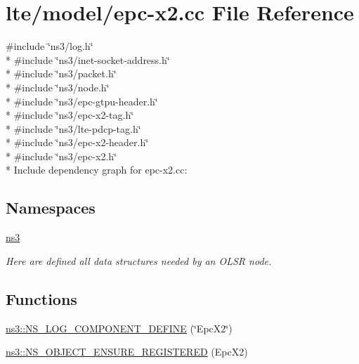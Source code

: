 \hypertarget{epc-x2_8cc}{}\section{lte/model/epc-\/x2.cc File Reference}
\label{epc-x2_8cc}
{\ttfamily \#include \char`\"{}ns3/log.\+h\char`\"{}}\\*
{\ttfamily \#include \char`\"{}ns3/inet-\/socket-\/address.\+h\char`\"{}}\\*
{\ttfamily \#include \char`\"{}ns3/packet.\+h\char`\"{}}\\*
{\ttfamily \#include \char`\"{}ns3/node.\+h\char`\"{}}\\*
{\ttfamily \#include \char`\"{}ns3/epc-\/gtpu-\/header.\+h\char`\"{}}\\*
{\ttfamily \#include \char`\"{}ns3/epc-\/x2-\/tag.\+h\char`\"{}}\\*
{\ttfamily \#include \char`\"{}ns3/lte-\/pdcp-\/tag.\+h\char`\"{}}\\*
{\ttfamily \#include \char`\"{}ns3/epc-\/x2-\/header.\+h\char`\"{}}\\*
{\ttfamily \#include \char`\"{}ns3/epc-\/x2.\+h\char`\"{}}\\*
Include dependency graph for epc-\/x2.cc\+:
\subsection*{Namespaces}
\begin{DoxyCompactItemize}
\item 
 \hyperlink{namespacens3}{ns3}
\begin{DoxyCompactList}\small\item\em Here are defined all data structures needed by an O\+L\+SR node. \end{DoxyCompactList}\end{DoxyCompactItemize}
\subsection*{Functions}
\begin{DoxyCompactItemize}
\item 
\hyperlink{namespacens3_a9fa7ce091684fb02eee25e6c84d2740e}{ns3\+::\+N\+S\+\_\+\+L\+O\+G\+\_\+\+C\+O\+M\+P\+O\+N\+E\+N\+T\+\_\+\+D\+E\+F\+I\+NE} (\char`\"{}Epc\+X2\char`\"{})
\item 
\hyperlink{namespacens3_a661235d2c1fd22cc93c6260b623cac46}{ns3\+::\+N\+S\+\_\+\+O\+B\+J\+E\+C\+T\+\_\+\+E\+N\+S\+U\+R\+E\+\_\+\+R\+E\+G\+I\+S\+T\+E\+R\+ED} (Epc\+X2)
\end{DoxyCompactItemize}
